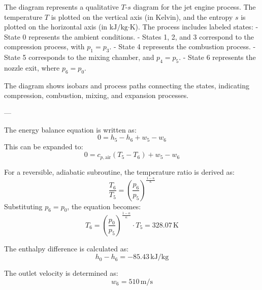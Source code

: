 The diagram represents a qualitative \( T \)-\( s \) diagram for the jet engine process. The temperature \( T \) is plotted on the vertical axis (in Kelvin), and the entropy \( s \) is plotted on the horizontal axis (in \( \text{kJ}/\text{kg·K} \)). The process includes labeled states:  
- State 0 represents the ambient conditions.  
- States 1, 2, and 3 correspond to the compression process, with \( p_1 = p_3 \).  
- State 4 represents the combustion process.  
- State 5 corresponds to the mixing chamber, and \( p_4 = p_5 \).  
- State 6 represents the nozzle exit, where \( p_6 = p_0 \).  

The diagram shows isobars and process paths connecting the states, indicating compression, combustion, mixing, and expansion processes.

---

The energy balance equation is written as:  
\[
0 = h_5 - h_6 + w_5 - w_6
\]  
This can be expanded to:  
\[
0 = c_{p,\text{air}} (T_5 - T_6) + w_5 - w_6
\]  

For a reversible, adiabatic subroutine, the temperature ratio is derived as:  
\[
\frac{T_6}{T_5} = \left( \frac{p_6}{p_5} \right)^{\frac{1 - \kappa}{\kappa}}
\]  
Substituting \( p_6 = p_0 \), the equation becomes:  
\[
T_6 = \left( \frac{p_0}{p_5} \right)^{\frac{1 - \kappa}{\kappa}} \cdot T_5 = 328.07 \, \text{K}
\]  

The enthalpy difference is calculated as:  
\[
h_0 - h_6 = -85.43 \, \text{kJ/kg}
\]  

The outlet velocity is determined as:  
\[
w_6 = 510 \, \text{m/s}
\]